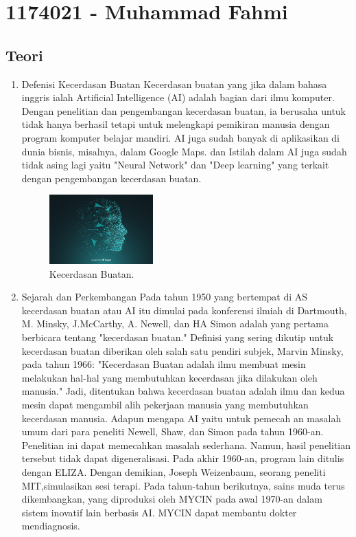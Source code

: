 \section{1174021 - Muhammad Fahmi}
\subsection{Teori}
\begin{enumerate}

	\item Defenisi Kecerdasan Buatan
	\hfill\break
	Kecerdasan buatan yang jika dalam bahasa inggris ialah Artificial Intelligence (AI) adalah bagian dari ilmu komputer. Dengan penelitian dan pengembangan kecerdasan buatan, ia berusaha untuk tidak hanya berhasil tetapi untuk melengkapi pemikiran manusia dengan program komputer belajar mandiri. AI juga sudah banyak di aplikasikan di dunia bisnis, misalnya, dalam Google Maps. dan Istilah dalam AI juga sudah tidak asing lagi yaitu "Neural Network" dan "Deep learning" yang terkait dengan pengembangan kecerdasan buatan.

	\begin{figure}[H]
	\centering
		\includegraphics[width=4cm]{figures/1174021/tugas1/materi/1.jpg}
		\caption{Kecerdasan Buatan.}
	\end{figure}

	\item Sejarah dan Perkembangan
	\hfill\break
	Pada tahun 1950 yang bertempat di AS kecerdasan buatan atau AI itu dimulai pada konferensi ilmiah di Dartmouth, M. Minsky, J.McCarthy, A. Newell, dan HA Simon adalah yang pertama berbicara tentang "kecerdasan buatan." Definisi yang sering dikutip untuk kecerdasan buatan diberikan oleh salah satu pendiri subjek, Marvin Minsky, pada tahun 1966: "Kecerdasan Buatan adalah ilmu membuat mesin melakukan hal-hal yang membutuhkan kecerdasan jika dilakukan oleh manusia." Jadi, ditentukan bahwa kecerdasan buatan adalah ilmu dan kedua mesin dapat mengambil alih pekerjaan manusia yang membutuhkan kecerdasan manusia. Adapun mengapa AI yaitu untuk pemecah an masalah umum dari para peneliti Newell, Shaw, dan Simon pada tahun 1960-an. Penelitian ini dapat memecahkan masalah sederhana. Namun, hasil penelitian tersebut tidak dapat digeneralisasi. Pada akhir 1960-an, program lain ditulis dengan ELIZA. Dengan demikian, Joseph Weizenbaum, seorang peneliti MIT,simulasikan sesi terapi. Pada tahun-tahun berikutnya, sains muda terus dikembangkan, yang diproduksi oleh MYCIN pada awal 1970-an dalam sistem inovatif lain berbasis AI. MYCIN dapat membantu dokter mendiagnosis.
	


\end{enumerate}
